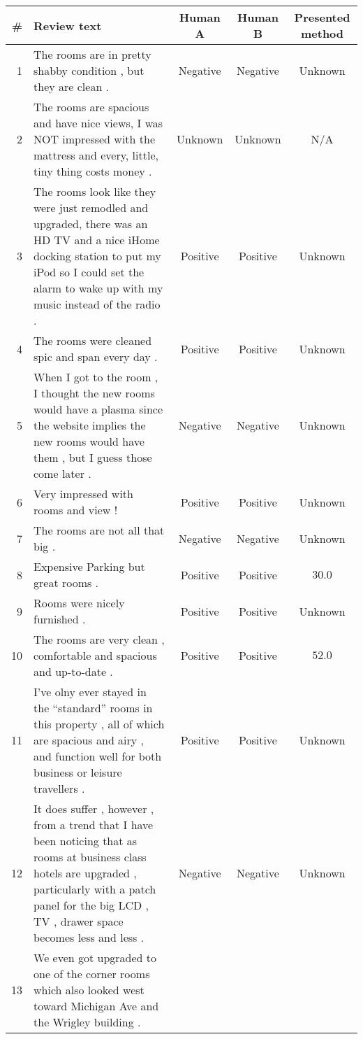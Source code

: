 \begin{landscape}
\begin{center}
\small %
\begin{longtable}{rm{9cm}ccc}
\# & Review text & Human A & Human B & Presented method \\
\hline\hline
\endhead
1 & The rooms are in pretty shabby condition , but they are clean . 
& Negative & Negative & Unknown \\ \hline
2 & The rooms are spacious and have nice views, I was NOT impressed with the mattress and every, little, tiny thing costs money . 
& Unknown & Unknown & N/A \\ \hline
3 & The rooms look like they were just remodled and upgraded, there was an HD TV and a nice iHome docking station to put my iPod so I could set the alarm to wake up with my music instead of the radio .
& Positive & Positive & Unknown \\ \hline
4 & The rooms were cleaned spic and span every day .
& Positive & Positive & Unknown \\ \hline
5 & When I got to the room , I thought the new rooms would have a plasma since the website implies the new rooms would have them , but I guess those come later .
& Negative & Negative & Unknown \\ \hline
6 & Very impressed with rooms and view !
& Positive & Positive & Unknown \\ \hline
7 & The rooms are not all that big .
& Negative & Negative & Unknown \\ \hline
8 & Expensive Parking but great rooms .
& Positive & Positive & $30.0$ \\ \hline
9 & Rooms were nicely furnished .
& Positive & Positive & Unknown \\ \hline
10 & The rooms are very clean , comfortable and spacious and up-to-date .
& Positive & Positive & $52.0$ \\ \hline
11 & I've olny ever stayed in the ``standard'' rooms in this property , all of which are spacious and airy , and function well for both business or leisure travellers .
& Positive & Positive & Unknown \\ \hline
12 & It does suffer , however , from a trend that I have been noticing that as rooms at business class hotels are upgraded ,  particularly with a patch panel for the big LCD , TV , drawer space becomes less and less .
& Negative & Negative & Unknown \\ \hline
13 & We even got upgraded to one of the corner rooms which also looked west toward Michigan Ave and the Wrigley building .

\end{longtable}
\end{center}
\end{landscape}
